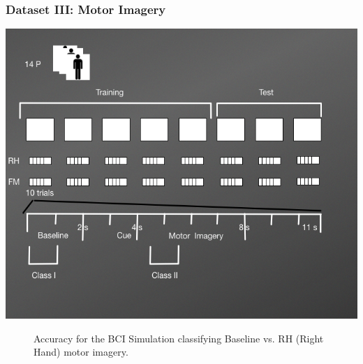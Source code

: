 \documentclass[aspectratio=169]{beamer}
\begin{document}
    
	\begin{frame}
	  \frametitle{Dataset III: Motor Imagery }
       \includegraphics[scale=0.38]{images/DatasetIIIDiagram2}    
    \end{frame}
   
   
   \begin{frame}   
   \begin{figure}[thpb]
      \centering
      \setlength\fboxsep{0pt}
	  \setlength\fboxrule{0.5pt}
      \caption{\centering Accuracy for the BCI Simulation classifying Baseline vs. RH (Right Hand) motor imagery.}
      \label{figure3}
   \end{figure} 	
	\end{frame}	  
	
\end{document}
